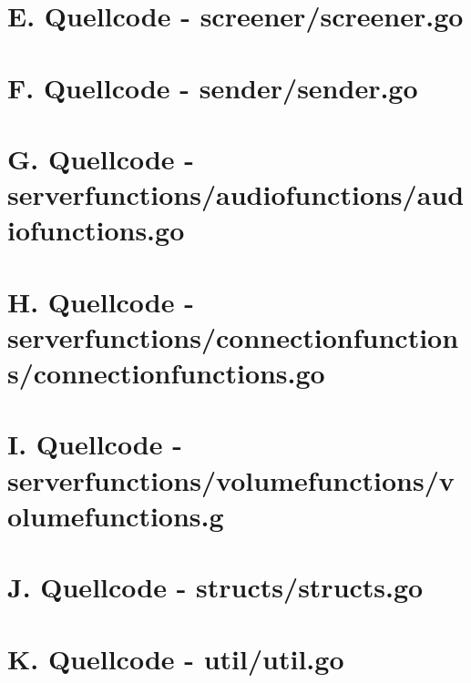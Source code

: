 \pagebreak

\section*{E. Quellcode - screener/screener.go}


\pagebreak

\section*{F. Quellcode - sender/sender.go}


\pagebreak

\section*{G. Quellcode - serverfunctions/audiofunctions/audiofunctions.go}


\pagebreak

\section*{H. Quellcode - serverfunctions/connectionfunctions/connectionfunctions.go}


\pagebreak

\section*{I. Quellcode - serverfunctions/volumefunctions/volumefunctions.g}


\pagebreak

\section*{J. Quellcode - structs/structs.go}


\pagebreak

\section*{K. Quellcode - util/util.go}

